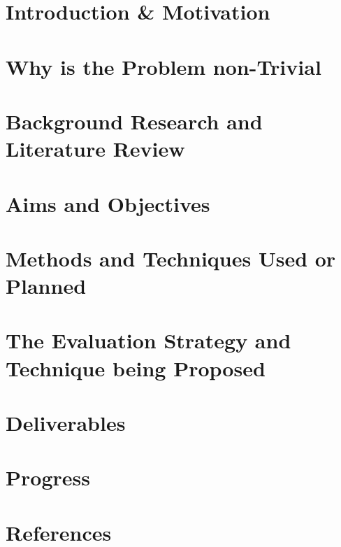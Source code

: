 \documentclass[12pt]{report}
\begin{document}
	\section{Introduction \& Motivation}
	
	\section{Why is the Problem non-Trivial}
	
	\section{Background Research and Literature Review}
	
	\section{Aims and Objectives}
	
	\section{Methods and Techniques Used or Planned}
	
	\section{The Evaluation Strategy and Technique being Proposed}
	
	\section{Deliverables}
	
	\section{Progress}
	
	\section{References}
\end{document}
